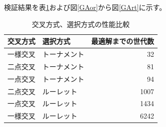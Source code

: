 \documentclass{jsarticle}
\begin{document}
検証結果を表\ref{GA_compare}および図\ref{GAor}から図\ref{GArt}に示す。

\begin{table}[H]
	\caption{交叉方式、選択方式の性能比較\label{GA_compare}}
	\begin{center}
		\begin{tabular}{|l|l|r|} \hline
			交叉方式 & 選択方式 & 最適解までの世代数 \\ \hline\hline
			一様交叉 & トーナメント & 32 \\ \hline
			二点交叉 & トーナメント & 81 \\ \hline
			一点交叉 & トーナメント & 94 \\ \hline
			二点交叉 & ルーレット & 1007 \\ \hline
			一点交叉 & ルーレット & 1434 \\ \hline
			一様交叉 & ルーレット & 6242 \\ \hline
		\end{tabular}
	\end{center}
\end{table}
\end{document}
